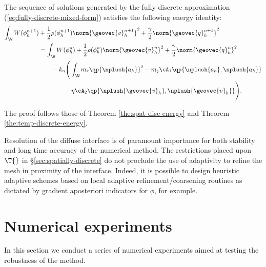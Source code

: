\documentclass[final]{amsart}
\numberwithin{equation}{section}
\begin{document}
\begin{The}
  \label{the:fully-discrete-energy}
  The sequence of solutions generated by the fully discrete
  approximation (\ref{eq:fully-discrete-mixed-form}) satisfies the
  following energy identity:
  \begin{equation}
    \begin{split}
      \int_\W 
      W(\phi_h^{n+1}) 
      &+
      \frac{1}{2} \rho(\phi_h^{n+1})\norm{{\geovec{v}}_h^{n+1}}^2
      +
      \frac{\gamma}{2} \norm{{\geovec{q}}_h^{n+1}}^2
      \\
      &=
      \int_\W 
      W(\phi_h^{n}) 
      +
      \frac{1}{2} \rho(\phi_h^{n})\norm{{\geovec{v}}_h^{n}}^2
      +
      \frac{\gamma}{2} \norm{{\geovec{q}}_h^{n}}^2
      \\
      &\qquad -
      k_n 
      \Bigg(\int_\W m_r \qp{\nplush{a_h}}^2
        -
        m_j \cA_1\qp{\nplush{a_h}, \nplush{a_h}} 
        \\
        &\qquad\qquad -
        \eta \cA_2\qp{\nplush{{\geovec{v}}_h}, \nplush{{\geovec{v}}_h}}
      \Bigg).
    \end{split}
  \end{equation}
\end{The}
\begin{Proof}
  The proof follows those of Theorem \ref{the:spat-disc-energy} and
  Theorem \ref{the:temp-discrete-energy}.
\end{Proof}

\begin{Rem}
  { Resolution of the diffuse interface is of paramount
    importance for both stability and long time accuracy of the
    numerical method. The restrictions placed upon $\T{}$ in
    \S\ref{sec:spatially-discrete} do not proclude the use of
    adaptivity to refine the mesh in proximity of the
    interface. Indeed, it is possible to design heuristic adaptive
    schemes based on local adaptive refinement/coarsening routines as
    dictated by gradient aposteriori indicators for $\phi$, for example. }
\end{Rem}

\section{Numerical experiments}
\label{sec:numerics}

In this section we conduct a series of numerical experiments aimed at
testing the robustness of the method.
\end{document}
